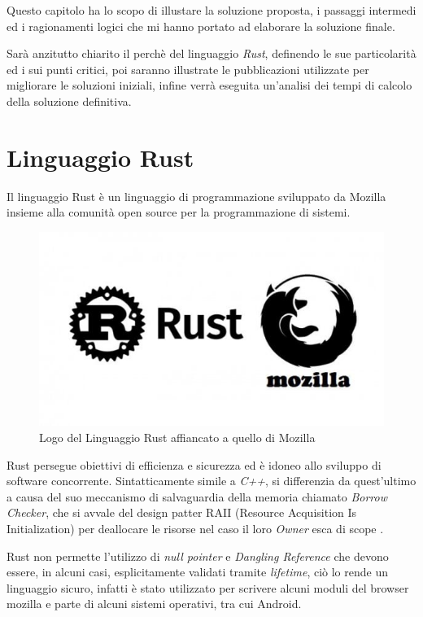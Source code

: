 Questo capitolo ha lo scopo di illustare la soluzione proposta, i passaggi intermedi ed i ragionamenti logici che mi hanno portato ad elaborare la soluzione finale.

Sarà anzitutto chiarito il perchè del linguaggio \textit{Rust}, definendo le sue particolarità ed i sui punti critici, poi saranno illustrate le pubblicazioni utilizzate per migliorare le soluzioni iniziali, infine verrà eseguita un'analisi dei tempi di calcolo della soluzione definitiva.

\section{Linguaggio Rust}
Il linguaggio Rust è un linguaggio di programmazione sviluppato da Mozilla insieme alla comunità open source per la programmazione di sistemi.

\begin{figure}
    \centering
    \includegraphics[scale=0.5]{images/rustlang.jpg}
    \caption{Logo del Linguaggio Rust affiancato a quello di Mozilla}
    \label{fig:rustlang1}
\end{figure}

Rust persegue obiettivi di efficienza e sicurezza ed è idoneo allo sviluppo di software concorrente. Sintatticamente simile a \textit{C++}, si differenzia da quest'ultimo a causa del suo meccanismo di salvaguardia della memoria chiamato \textit{Borrow Checker}, che si avvale del design patter \textsc{RAII} (Resource Acquisition Is Initialization) per deallocare le risorse nel caso il loro \textit{Owner} esca di scope \cite{10.5555/3271463}.

Rust non permette l'utilizzo di \textit{null pointer} e \textit{Dangling Reference} che devono essere, in alcuni casi, esplicitamente validati tramite \textit{lifetime}, ciò lo rende un linguaggio sicuro, infatti è stato utilizzato per scrivere alcuni moduli del browser mozilla e parte di alcuni sistemi operativi, tra cui Android.

